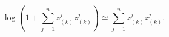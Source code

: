 \begin{equation}
\log{\left(1 + \sum_{j=1}^n z^j_{(k)} {\bar z}^j_{(k)}\right)}\simeq \sum_{j=1}^n 
z^j_{(k)} {\bar z}^j_{(k)}.
\label{tayy}
\end{equation}

